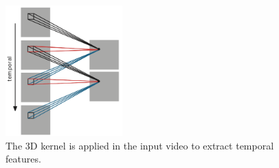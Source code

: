 \begin{figure}[!htb]	\includegraphics[width=0.4\textwidth]{images/3d_convolution.png} 
    \centering

\caption{
The 3D kernel is applied in the input video to extract temporal features. \cite{Tran2015LearningNetworks}
} 

\label{fig:3d_convolution}
\end{figure}